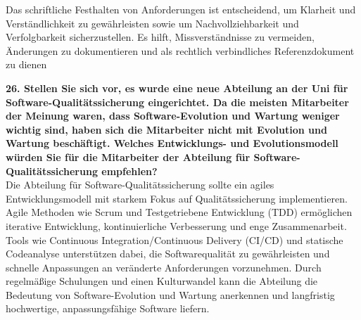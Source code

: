 \documentclass{article}
\begin{document}
Das schriftliche Festhalten von Anforderungen ist entscheidend, um Klarheit und Verständlichkeit zu gewährleisten sowie um Nachvollziehbarkeit und Verfolgbarkeit sicherzustellen. Es hilft, Missverständnisse zu vermeiden, Änderungen zu dokumentieren und als rechtlich verbindliches Referenzdokument zu dienen\\
\textbf{26. Stellen Sie sich vor, es wurde eine neue Abteilung an der Uni für Software-Qualitätssicherung eingerichtet. Da die meisten Mitarbeiter der Meinung waren, dass Software-Evolution und Wartung weniger wichtig sind, haben sich die Mitarbeiter nicht mit Evolution und Wartung beschäftigt. Welches Entwicklungs- und Evolutionsmodell würden Sie für die Mitarbeiter der Abteilung für Software-Qualitätssicherung empfehlen?}\\
Die Abteilung für Software-Qualitätssicherung sollte ein agiles Entwicklungsmodell mit starkem Fokus auf Qualitätssicherung implementieren. Agile Methoden wie Scrum und Testgetriebene Entwicklung (TDD) ermöglichen iterative Entwicklung, kontinuierliche Verbesserung und enge Zusammenarbeit. Tools wie Continuous Integration/Continuous Delivery (CI/CD) und statische Codeanalyse unterstützen dabei, die Softwarequalität zu gewährleisten und schnelle Anpassungen an veränderte Anforderungen vorzunehmen. Durch regelmäßige Schulungen und einen Kulturwandel kann die Abteilung die Bedeutung von Software-Evolution und Wartung anerkennen und langfristig hochwertige, anpassungsfähige Software liefern.
\end{document}

